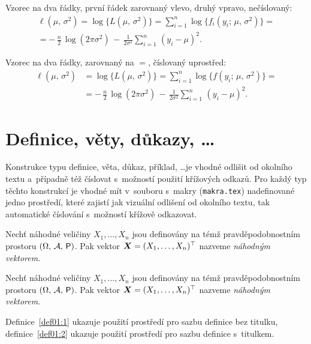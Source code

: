 Vzorec na dva řádky, první řádek zarovnaný vlevo, druhý vpravo, nečíslovaný:
\begin{multline*}
      \ell(\mu,\,\sigma^2) = \log\bigl\{L(\mu,\,\sigma^2)\bigr\} =
      \sum_{i=1}^n \log\bigl\{f_i(y_i;\,\mu,\,\sigma^2)\bigr\}= \\
      = -\,\frac{n}{2}\,\log(2\pi\sigma^2) \,-\,
      \frac{1}{2\sigma^2}\sum_{i=1}^n\,(y_i - \mu)^2.
\end{multline*}

Vzorec na dva řádky, zarovnaný na $=$, číslovaný uprostřed:
\begin{equation}\label{eq01:ell}
      \begin{split}
            \ell(\mu,\,\sigma^2) &= \log\bigl\{L(\mu,\,\sigma^2)\bigr\} =
            \sum_{i=1}^n \log\bigl\{f(y_i;\,\mu,\,\sigma^2)\bigr\}= \\
            & = -\,\frac{n}{2}\,\log(2\pi\sigma^2) \,-\,
            \frac{1}{2\sigma^2}\sum_{i=1}^n\,(y_i - \mu)^2.
      \end{split}
\end{equation}

\section{Definice, věty, důkazy, \dots}

Konstrukce typu definice, věta, důkaz, příklad, \dots je vhodné
odlišit od okolního textu a~případně též číslovat s~možností použití
křížových odkazů. Pro každý typ těchto konstrukcí je vhodné mít
v~souboru s~makry (\texttt{makra.tex}) nadefinované jedno prostředí,
které zajistí jak vizuální odlišení od okolního textu, tak
automatické číslování s~možností křížově odkazovat.

\begin{definice}\label{def01:1}
      Nechť náhodné veličiny $X_1,\dots,X_n$ jsou definovány na témž
      prav\-dě\-po\-dob\-nost\-ním prostoru $(\Omega,\,\mathcal{A},\,\operatorname{\textsf{P}})$. Pak
      vektor $\bm X = (X_1,\dots,X_n)^\top$ nazveme \emph{náhodným
            vektorem}.
\end{definice}

\begin{definice}\label{def01:2}
      Nechť náhodné veličiny $X_1,\dots,X_n$ jsou definovány na témž
      pravděpodobnostním prostoru $(\Omega,\,\mathcal{A},\,\operatorname{\textsf{P}})$. Pak
      vektor $\bm X = (X_1,\dots,X_n)^\top$ nazveme \emph{náhodným
            vektorem}.
\end{definice}
Definice~\ref{def01:1} ukazuje použití prostředí pro sazbu definice
bez titulku, definice~\ref{def01:2} ukazuje použití prostředí pro
sazbu definice s~titulkem.

